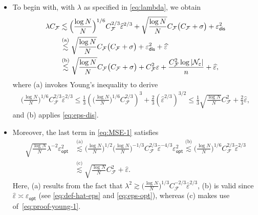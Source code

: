\documentclass[english]{article}
\begin{document}
\begin{itemize}
\item To begin with, 
with $\lambda$ as specified in \eqref{eq:lambda}, 
we obtain
\begin{align}
\lambda C_{\mathcal{F}}
&\overset{\text{}}{\lesssim} \Big(\frac{\log N}{N}\Big)^{1/6} C_{\mathcal{F}}^{2/3}\widehat{\varepsilon}^{2/3} + \sqrt{\frac{\log N}{N}}C_{\mathcal{F}}\big(C_{\mathcal{F}} + \sigma\big) + \varepsilon_{\mathsf{dis}}^2\notag\\
&\overset{\text{(a)}}{\lesssim} \sqrt{\frac{\log N}{N}}C_{\mathcal{F}}\big(C_{\mathcal{F}} + \sigma\big) + \varepsilon_{\mathsf{dis}}^2 + \widehat{\varepsilon}\label{eq:bound-lambda-C}\\
&\overset{\text{(b)}}{\lesssim} \sqrt{\frac{\log N}{N}}C_{\mathcal{F}}\big(C_{\mathcal{F}} + \sigma\big)  + C_{\mathcal{F}}^2\varepsilon + \frac{C_{\mathcal{F}}^2\log|\mathcal{N}_\varepsilon|}{n}+ \widehat{\varepsilon},\label{eq:proof-young}
\end{align}
 where
(a) invokes Young's inequality to derive
%
\begin{align}\label{eq:proof-young-1}
\Big(\frac{\log N}{N}\Big)^{1/6} C_{\mathcal{F}}^{2/3}\widehat{\varepsilon}^{2/3}
\le\frac13\left(\Big(\frac{\log N}{N}\Big)^{1/6} C_{\mathcal{F}}^{2/3}\right)^3 +  \frac23(\widehat{\varepsilon}^{2/3})^{3/2} \le \frac13\sqrt{\frac{\log N}{N}} C_{\mathcal{F}}^{2} + \frac23\widehat{\varepsilon},
\end{align}
and (b) applies \eqref{eq:eps-dis}.
\item 
Moreover, the last term in \eqref{eq:MSE-1} satisfies
%
\begin{align}\label{eq:proof-lambda-2epsopt}
\sqrt{\frac{\log N}{N}}\lambda^{-2}\varepsilon_{\mathsf{opt}}^2&\overset{\text{(a)}}{\lesssim} \Big(\frac{\log N}{N}\Big)^{1/2}\Big(\frac{\log N}{N}\Big)^{-1/3} C_{\mathcal{F}}^{2/3}\widehat{\varepsilon}^{-4/3}\varepsilon_{\mathsf{opt}}^2
\overset{\text{(b)}}{\lesssim} \Big(\frac{\log N}{N}\Big)^{1/6} C_{\mathcal{F}}^{2/3}\widehat{\varepsilon}^{2/3}\nonumber\\
&\overset{\text{(c)}}{\lesssim}\sqrt{\frac{\log N}{N}} C_{\mathcal{F}}^{2} + \widehat{\varepsilon}. 
\end{align}
Here, (a) results from the fact that $\lambda^2\gtrsim \Big(\frac{\log N}{N}\Big)^{1/3} C_{\mathcal{F}}^{-2/3}\widehat{\varepsilon}^{2/3}$, 
(b) is valid since $\widehat{\varepsilon} \asymp \varepsilon_{\mathsf{opt}}$ (see \eqref{eq:def-hat-eps} and \eqref{eq:eps-opt}), 
whereas (c) makes use of~\eqref{eq:proof-young-1}.
\end{itemize}
\end{document}
